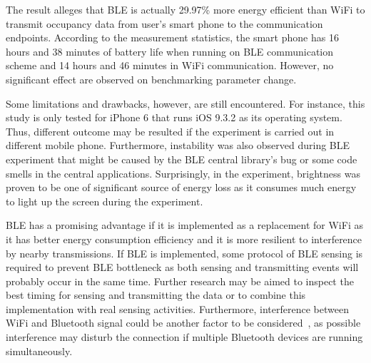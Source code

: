 \documentclass[journal]{vgtc}                %
\begin{document}
The result alleges that BLE is actually 29.97\% more energy efficient than WiFi to transmit occupancy data from user's smart phone to the communication endpoints. According to the measurement statistics, the smart phone has 16 hours and 38 minutes of battery life when running on BLE communication scheme and 14 hours and 46 minutes in WiFi communication. However, no significant effect are observed on benchmarking parameter change.

Some limitations and drawbacks, however, are still encountered. For instance, this study is only tested for iPhone 6 that runs iOS 9.3.2 as its operating system. Thus, different outcome may be resulted if the experiment is carried out in different mobile phone. Furthermore, instability was also observed during BLE experiment that might be caused by the BLE central library's bug or some code smells in the central applications. Surprisingly, in the experiment, brightness was proven to be one of significant source of energy loss as it consumes much energy to light up the screen during the experiment.

BLE has a promising advantage if it is implemented as a replacement for WiFi as it has better energy consumption efficiency and it is more resilient to interference by nearby transmissions. If BLE is implemented, some protocol of BLE sensing is required to prevent BLE bottleneck as both sensing and transmitting events will probably occur in the same time. Further research may be aimed to inspect the best timing for sensing and transmitting the data or to combine this implementation with real sensing activities. Furthermore, interference between WiFi and Bluetooth signal could be another factor to be considered~\cite{Lin2013}, as possible interference may disturb the connection if multiple Bluetooth devices are running simultaneously.





\end{document}
